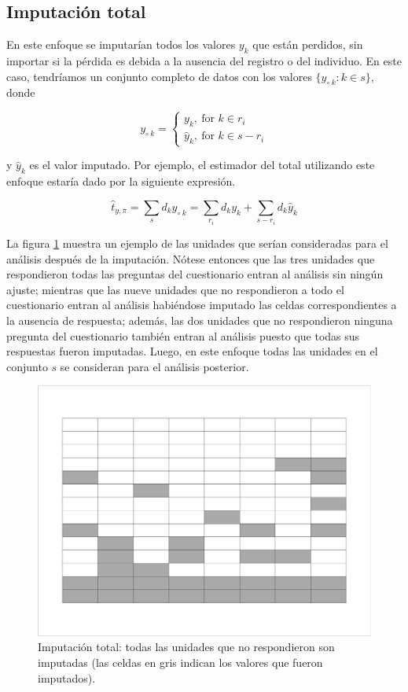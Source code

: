 \documentclass[
  12pt,
]{book}
\begin{document}
\hypertarget{imputaciuxf3n-total}{%
\subsection{Imputación total}\label{imputaciuxf3n-total}}

En este enfoque se imputarían todos los valores \(y_k\) que están perdidos, sin importar si la pérdida es debida a la ausencia del registro o del individuo. En este caso, tendríamos un conjunto completo de datos con los valores \(\{y_{\circ \  k}: k\in s\}\), donde

\[
y_{\circ \  k} = 
\begin{cases}
y_k, \ \text{for $k \in r_i$} \\
\hat{y}_k, \ \text{for $k \in s - r_i$}
\end{cases}
\]

y \(\hat{y}_k\) es el valor imputado. Por ejemplo, el estimador del total utilizando este enfoque estaría dado por la siguiente expresión.

\[
\hat{t}_{y,\pi} = \sum_s d_{k}y_{\circ \  k}
= \sum_{r_i}d_{k}y_k + \sum_{s - r_i}d_{k}\hat{y}_k
\]

La figura \ref{fig:figimptotal} muestra un ejemplo de las unidades que serían consideradas para el análisis después de la imputación. Nótese entonces que las tres unidades que respondieron todas las preguntas del cuestionario entran al análisis sin ningún ajuste; mientras que las nueve unidades que no respondieron a todo el cuestionario entran al análisis habiéndose imputado las celdas correspondientes a la ausencia de respuesta; además, las dos unidades que no respondieron ninguna pregunta del cuestionario también entran al análisis puesto que todas sus respuestas fueron imputadas. Luego, en este enfoque todas las unidades en el conjunto \(s\) se consideran para el análisis posterior.

\begin{figure}
\includegraphics[width=0.5\linewidth]{Pics/j3} \caption{Imputación total: todas las unidades que no respondieron son imputadas (las celdas en gris indican los valores que fueron imputados).}\label{fig:figimptotal}
\end{figure}
\end{document}
